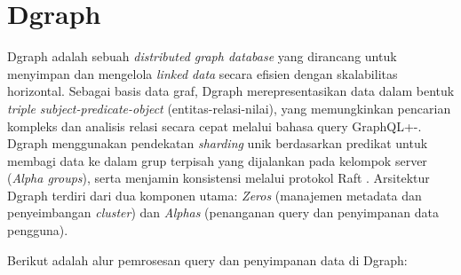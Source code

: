 \section{Dgraph}
\label{sec:dgraph}

Dgraph adalah sebuah \textit{distributed graph database} yang dirancang untuk menyimpan dan mengelola \textit{linked data} secara efisien dengan skalabilitas horizontal. Sebagai basis data graf, Dgraph merepresentasikan data dalam bentuk \textit{triple} \textit{subject-predicate-object} (entitas-relasi-nilai), yang memungkinkan pencarian kompleks dan analisis relasi secara cepat melalui bahasa query GraphQL+-. Dgraph menggunakan pendekatan \textit{sharding} unik berdasarkan predikat untuk membagi data ke dalam grup terpisah yang dijalankan pada kelompok server (\textit{Alpha groups}), serta menjamin konsistensi melalui protokol Raft \parencite{jain2005dgraph}. Arsitektur Dgraph terdiri dari dua komponen utama: \textit{Zeros} (manajemen metadata dan penyeimbangan \textit{cluster}) dan \textit{Alphas} (penanganan query dan penyimpanan data pengguna).


Berikut adalah alur pemrosesan query dan penyimpanan data di Dgraph:

